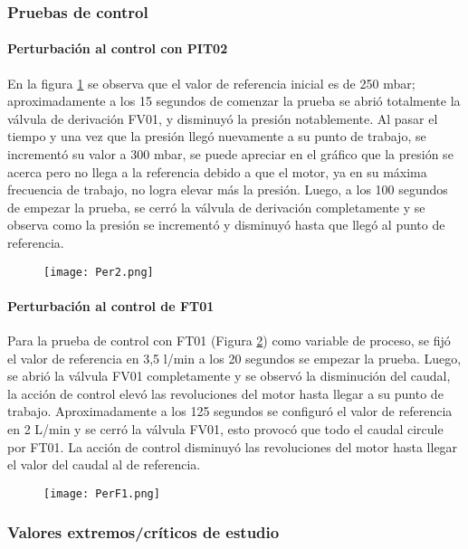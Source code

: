 {\subsubsection{Pruebas de control}
\paragraph{Perturbación al control con PIT02}
En la figura \ref{fig:per2} se observa que el valor de referencia inicial es de 250 mbar; aproximadamente a los 15 segundos de comenzar la prueba se abrió totalmente la válvula de derivación FV01, y disminuyó la presión notablemente. Al pasar el tiempo y una vez que la presión llegó nuevamente a su punto de trabajo, se incrementó su valor a 300 mbar, se puede apreciar en el gráfico que la presión se acerca pero no llega a la referencia debido a que el motor, ya en su máxima frecuencia de trabajo, no logra elevar más la presión. Luego, a los 100 segundos de empezar la prueba, se cerró la válvula de derivación completamente y se observa como la presión se incrementó y disminuyó hasta que llegó al punto de referencia.
\begin{figure}[htb]
	\centering
	\texttt{[image: Per2.png]}
	\label{fig:per2}
\end{figure}

\paragraph{Perturbación al control de FT01}
Para la prueba de control con FT01 (Figura \ref{fig:per1}) como variable de proceso, se fijó el valor de referencia en 3,5 l/min a los 20 segundos se empezar la prueba. Luego, se abrió la válvula FV01 completamente y se observó la disminución del caudal, la acción de control elevó las revoluciones del motor hasta llegar a su punto de trabajo. Aproximadamente a los 125 segundos se configuró el valor de referencia en 2 L/min y se cerró la válvula FV01, esto provocó que todo el caudal circule por FT01. La acción de control disminuyó las revoluciones del motor hasta llegar el valor del caudal al de referencia.

\begin{figure}[htb]
	\centering
	\texttt{[image: PerF1.png]}
	\label{fig:per1}
\end{figure}


\subsubsection{Valores extremos/críticos de estudio}

}
